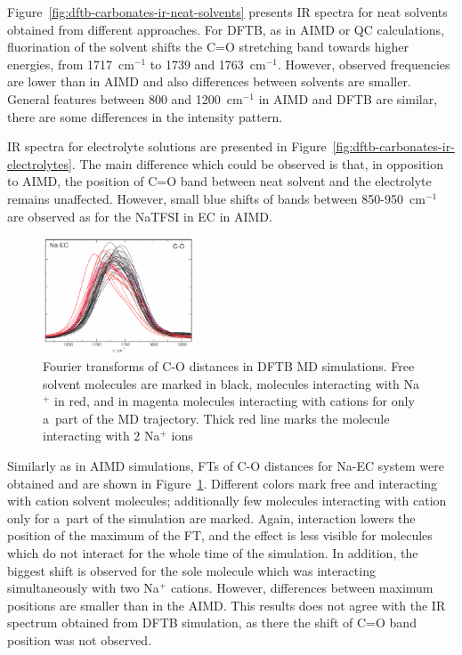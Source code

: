 Figure~\ref{fig:dftb-carbonates-ir-neat-solvents} presents IR spectra for neat solvents obtained from different approaches. For DFTB, as in AIMD or QC calculations, fluorination of the solvent shifts the C=O stretching band towards higher energies, from 1717~cm$^{-1}$ to 1739 and 1763~cm$^{-1}$. However, observed frequencies are lower than in AIMD and also differences between solvents are smaller. General features between 800 and 1200~cm$^{-1}$ in AIMD and DFTB are similar, there are some differences in the intensity pattern.

IR spectra for electrolyte solutions are presented in Figure~\ref{fig:dftb-carbonates-ir-electrolytes}. The main difference which could be observed is that, in opposition to AIMD, the position of C=O band between neat solvent and the electrolyte remains unaffected. However, small blue shifts of bands between 850-950~cm$^{-1}$ are observed as for the NaTFSI in EC in AIMD.

\begin{figure}[H]
    \centering
    \includegraphics[width=0.4\textwidth]{img/5-alternatives-to-aimd/1-carbonates/ft-c-o.png}
    \singlespacing
    \caption{Fourier transforms of C-O distances in DFTB MD simulations. Free solvent molecules are marked in black, molecules interacting with Na$^{+}$ in red, and in magenta molecules interacting with cations for only a~part of the MD trajectory. Thick red line marks the molecule interacting with 2 Na$^{+}$ ions}
    \label{fig:dftb-carbonates-ft-c-o}
\end{figure}

Similarly as in AIMD simulations, FTs of C-O distances for Na-EC system were obtained and are shown in Figure~\ref{fig:dftb-carbonates-ft-c-o}. Different colors mark free and interacting with cation solvent molecules; additionally few molecules interacting with cation only for a~part of the simulation are marked. Again, interaction lowers the position of the maximum of the FT, and the effect is less visible for molecules which do not interact for the whole time of the simulation. In addition, the biggest shift is observed for the sole molecule which was interacting simultaneously with two Na$^{+}$ cations. However, differences between maximum positions are smaller than in the AIMD. This results does not agree with the IR spectrum obtained from DFTB simulation, as there the shift of C=O band position was not observed.

